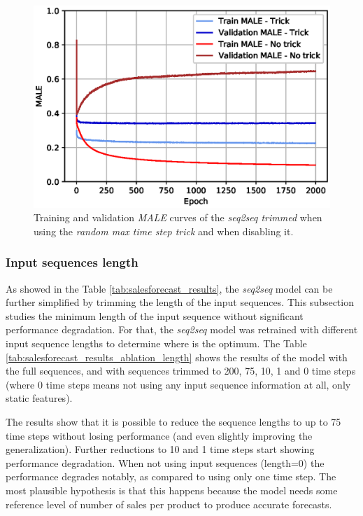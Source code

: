 \begin{figure}[h!]
	\centering
	\includegraphics[width=0.7\linewidth]{salesforecast/images/train_curves_notrick}
	\caption[Training and validation sales \textit{MALE} curves]{Training and validation \textit{MALE} curves of the \textit{seq2seq trimmed} when using the \textit{random max time step trick} and when disabling it.}
	\label{fig:traincurvesnotrick}
\end{figure}

\subsubsection{Input sequences length}
As showed in the Table \ref{tab:salesforecast_results}, the \textit{seq2seq} model can be further simplified by trimming the length of the input sequences. This subsection studies the minimum length of the input sequence without significant performance degradation. For that, the \textit{seq2seq} model was retrained with different input sequence lengths to determine where is the optimum. The Table 		\ref{tab:salesforecast_results_ablation_length} shows the results of the model with the full sequences, and with sequences trimmed to 200, 75, 10, 1 and 0 time steps (where 0 time steps means not using any input sequence information at all, only static features). 

The results show that it is possible to reduce the sequence lengths to up to 75 time steps without losing performance (and even slightly improving the generalization). Further reductions to 10 and 1 time steps start showing performance degradation. When not using input sequences (length=0) the performance degrades notably, as compared to using only one time step. The most plausible hypothesis is that this happens because the model needs some reference level of number of sales per product to produce accurate forecasts.

